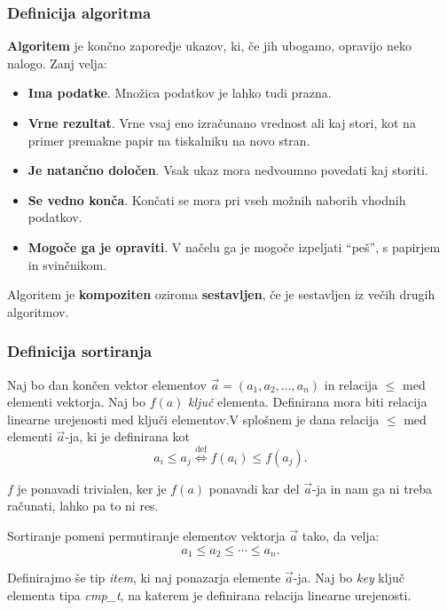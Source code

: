 \documentclass[a4paper,oneside,10pt]{article}
\begin{document}
\subsubsection{Definicija algoritma}

\textbf{Algoritem} je končno zaporedje ukazov, ki, če jih ubogamo, opravijo neko nalogo.
Zanj velja:
\begin{itemize}
  \item \textbf{Ima podatke}. Množica podatkov je lahko tudi prazna.
  \item \textbf{Vrne rezultat}. Vrne vsaj eno izračunano vrednost ali kaj stori, kot na primer
    premakne papir na tiskalniku na novo stran.
  \item \textbf{Je natančno določen}. Vsak ukaz mora nedvoumno povedati kaj storiti.
  \item \textbf{Se vedno konča}. Končati se mora pri vseh možnih naborih vhodnih podatkov.
  \item \textbf{Mogoče ga je opraviti}. V načelu ga je mogoče izpeljati ``peš'', s papirjem in
    svinčnikom.
\end{itemize}

\begin{definicija}
  Algoritem je \textbf{kompoziten} oziroma \textbf{sestavljen}, če je sestavljen iz večih
  drugih algoritmov.
\end{definicija}


\subsubsection{Definicija sortiranja}
Naj bo dan končen vektor elementov $\vec{a} = \left(a_1, a_2, \ldots, a_n \right)$ in
relacija $\leq$ med elementi vektorja.
Naj bo $f(a)$ \emph{ključ} elementa. Definirana mora biti relacija linearne urejenosti med 
ključi elementov.V splošnem je dana relacija $\leq$ med elementi $\vec{a}$-ja, ki je definirana kot 
\[a_i \leq a_j \overset{\text{def}}{\Longleftrightarrow} f(a_i) \leq f(a_j). \]

$f$ je ponavadi trivialen, ker je $f(a)$ ponavadi kar del $\vec{a}$-ja in nam ga ni treba
računati, lahko pa to ni res. 

Sortiranje pomeni permutiranje elementov vektorja $\vec{a}$ tako, da velja:
\[ a_1 \leq a_2 \leq \cdots \leq a_n.\]

Definirajmo še tip \emph{item}, ki naj ponazarja elemente $\vec{a}$-ja. Naj bo \emph{key}
ključ elementa tipa \emph{cmp\_t}, na katerem je definirana relacija linearne urejenosti.
\end{document}

